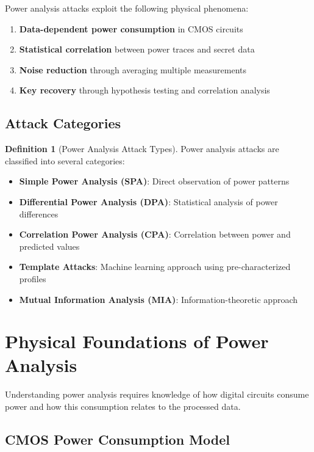 \documentclass[11pt,a4paper]{article}
\theoremstyle{definition}
\newtheorem{definition}{Definition}[section]
\begin{document}
Power analysis attacks exploit the following physical phenomena:

\begin{enumerate}[label=\textbf{\arabic*.}]
    \item \textbf{Data-dependent power consumption} in CMOS circuits
    \item \textbf{Statistical correlation} between power traces and secret data
    \item \textbf{Noise reduction} through averaging multiple measurements
    \item \textbf{Key recovery} through hypothesis testing and correlation analysis
\end{enumerate}

\subsection{Attack Categories}

\begin{definition}[Power Analysis Attack Types]
Power analysis attacks are classified into several categories:
\begin{itemize}
    \item \textbf{Simple Power Analysis (SPA)}: Direct observation of power patterns
    \item \textbf{Differential Power Analysis (DPA)}: Statistical analysis of power differences
    \item \textbf{Correlation Power Analysis (CPA)}: Correlation between power and predicted values
    \item \textbf{Template Attacks}: Machine learning approach using pre-characterized profiles
    \item \textbf{Mutual Information Analysis (MIA)}: Information-theoretic approach
\end{itemize}
\end{definition}

\section{Physical Foundations of Power Analysis}

Understanding power analysis requires knowledge of how digital circuits consume power and how this consumption relates to the processed data.

\subsection{CMOS Power Consumption Model}
\end{document}
